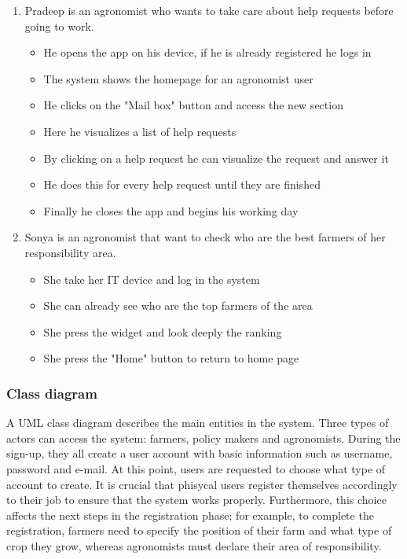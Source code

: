 \documentclass[table, 12pt]{article}
\begin{document}
\begin{enumerate}
    \item Pradeep is an agronomist who wants to take care about help requests before going to work.
    \begin{itemize}
        \item He opens the app on his device, if he is already registered he logs in
        \item The system shows the homepage for an agronomist user
        \item He clicks on the "Mail box" button and access the new section
        \item Here he visualizes a list of help requests
        \item By clicking on a help request he can visualize the request and answer it
        \item He does this for every help request until they are finished
        \item Finally he closes the app and begins his working day
    \end{itemize} 

    \item Sonya is an agronomist that want to check who are the best farmers of her responsibility area.
    \begin{itemize}
        \item She take her IT device and log in the system 
        \item She can already see who are the top farmers of the area
        \item She press the widget and look deeply the ranking
        \item She press the "Home" button to return to home page
    \end{itemize}
\end{enumerate}


\subsubsection{Class diagram}
\label{class_diagram}
A UML class diagram describes the main entities in the system.
Three types of actors can access the system: farmers, policy makers and agronomists.
During the sign-up, they all create a user account with basic information such as username, password and e-mail.
At this point, users are requested to choose what type of account to create. It is crucial that phisycal users register themselves accordingly to their job to ensure that the system works properly. Furthermore, this choice affects the next steps in the registration phase; for example, to complete the registration, farmers need to specify the position of their farm and what type of crop they grow, whereas agronomists must declare their area of responsibility.
\end{document}
